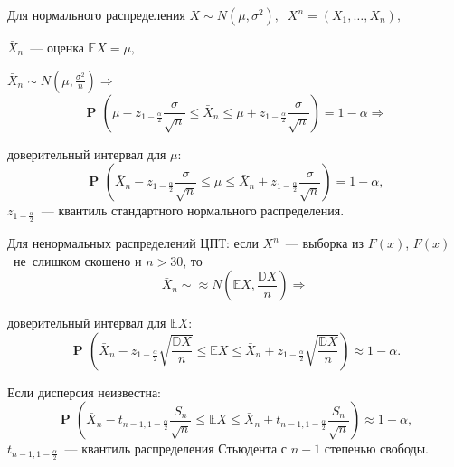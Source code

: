 \documentclass[9pt,pdf,utf8,hyperref={unicode},aspectratio=169]{beamer}
\DeclareMathOperator{\prob}{\mathbf{P}\!}
\begin{document}
\begin{frame}{Для нормального распределения}
	$X\sim N\left(\mu,\sigma^2\right),\;\; X^n=\left(X_1,\dots,X_n\right),$
	
	\bigskip
	
	$\bar{X}_n$~--- оценка $\mathbb{E}X=\mu,$
	\bigskip
	
    $\bar{X}_n\sim N\left(\mu, \frac{\sigma^2}{n}\right) \Rightarrow $
	$$\prob \left(\mu-z_{1-\frac{\alpha}{2}} \frac{\sigma}{\sqrt{n}}  \leq \bar{X}_n \leq \mu +z_{1-\frac{\alpha}{2}} \frac{\sigma}{\sqrt{n}} \right)=1-\alpha \Rightarrow $$
	
	доверительный интервал для $\mu$:
	$$\prob \left(\bar{X}_n-z_{1-\frac{\alpha}{2}} \frac{\sigma}{\sqrt{n}}  \leq \mu \leq \bar{X}_n +z_{1-\frac{\alpha}{2}} \frac{\sigma}{\sqrt{n}} \right)=1-\alpha,$$
	$z_{1-\frac{\alpha}{2}}$~--- квантиль стандартного нормального распределения.
\end{frame}

\begin{frame}{Для ненормальных распределений}
	ЦПТ: если $X^n$~--- выборка из $F(x)$, $F(x)$~не~слишком скошено и $n>30$, то 
	$$\bar{X}_n \sim \approx N\left(\mathbb{E}X, \frac{\mathbb{D}X}{n}\right) \Rightarrow$$
	
	доверительный интервал для $\mathbb{E}X$:
	$$\prob \left(\bar{X}_n-z_{1-\frac{\alpha}{2}} \sqrt{\frac{\mathbb{D}X}{n}}  \leq \mathbb{E}X \leq \bar{X}_n +z_{1-\frac{\alpha}{2}} \sqrt{\frac{\mathbb{D}X}{n}} \right)\approx 1-\alpha.$$
	
	Если дисперсия неизвестна:
	$$\prob \left(\bar{X}_n-t_{n-1, 1-\frac{\alpha}{2}} \frac{S_n}{\sqrt{n}}  \leq \mathbb{E}X \leq \bar{X}_n +t_{n-1, 1-\frac{\alpha}{2}} \frac{S_n}{\sqrt{n}} \right)\approx 1-\alpha,$$
	$t_{n-1, 1-\frac{\alpha}{2}}$~--- квантиль распределения Стьюдента с $n-1$ степенью свободы.
\end{frame}
\end{document}
